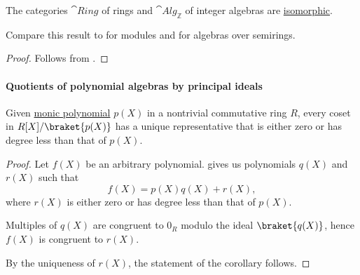 \begin{proposition}\label{thm:ring_is_integer_algebra}
  The categories \( \hyperref[def:ring/category]{\cat{Ring}} \) of rings and \( \hyperref[def:algebra_over_ring/category]{\cat{Alg}_\BbbZ} \) of integer algebras are \hyperref[rem:category_similarity/isomorphism]{isomorphic}.
\end{proposition}
\begin{comments}
  \item Compare this result to  for modules and  for algebras over semirings.
\end{comments}
\begin{proof}
  Follows from .
\end{proof}

\paragraph{Quotients of polynomial algebras by principal ideals}

\begin{proposition}\label{thm:representatives_in_univariate_polynomial_quotient_set}
  Given \hyperref[def:monic_polynomial]{monic polynomial} \( p(X) \) in a nontrivial commutative ring \( R \), every coset in \( R[X] / \braket{ p(X) } \) has a unique representative that is either zero or has degree less than that of \( p(X) \).
\end{proposition}
\begin{proof}
  Let \( f(X) \) be an arbitrary polynomial.  gives us polynomials \( q(X) \) and \( r(X) \) such that
  \begin{equation*}
    f(X) = p(X) q(X) + r(X),
  \end{equation*}
  where \( r(X) \) is either zero or has degree less than that of \( p(X) \).

  Multiples of \( q(X) \) are congruent to \( 0_R \) modulo the ideal \( \braket{ q(X) } \), hence \( f(X) \) is congruent to \( r(X) \).

  By the uniqueness of \( r(X) \), the statement of the corollary follows.
\end{proof}


